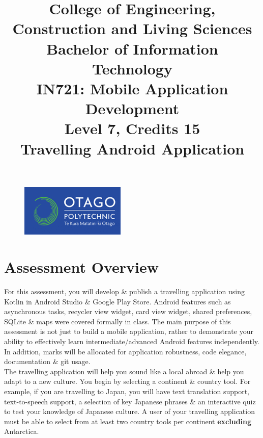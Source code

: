 \documentclass{article}
\author{}
\begin{document}
\begin{figure}
	\centering
	\includegraphics[width=50mm]{./img/logo.png}
\end{figure}

\title{College of Engineering, Construction and Living Sciences\\Bachelor of Information Technology\\IN721: Mobile Application Development\\Level 7, Credits 15\\\textbf{Travelling Android Application}}
\date{}
\maketitle

\section*{Assessment Overview}
For this assessment, you will develop \& publish a travelling application using Kotlin in Android Studio \& Google Play Store. Android features such as asynchronous tasks, recycler view widget, card view widget, shared preferences, SQLite \& maps were covered formally in class. The main purpose of this assessment is not just to build a mobile application, rather to demonstrate your ability to effectively learn intermediate/advanced Android features independently. In addition, marks will be allocated for application robustness, code elegance, documentation \& git usage. \\ 

The travelling application will help you sound like a local abroad \& help you adapt to a new culture. You begin by selecting a continent \& country tool. For example, if you are travelling to Japan, you will have text translation support, text-to-speech support, a selection of key Japanese phrases \& an interactive quiz to test your knowledge of Japanese culture. A user of your travelling application must be able to select from at least two country tools per continent \textbf{excluding} Antarctica.
\end{document}
